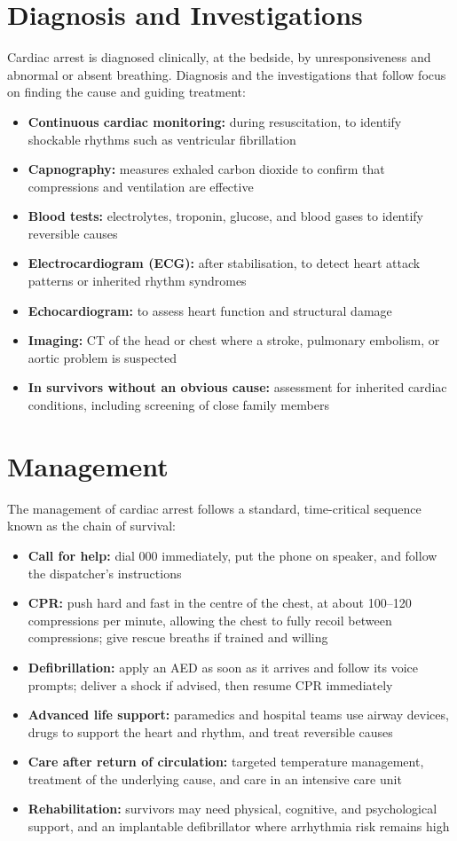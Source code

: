 \section*{Diagnosis and Investigations}
Cardiac arrest is diagnosed clinically, at the bedside, by unresponsiveness and abnormal or absent breathing. Diagnosis and the investigations that follow focus on finding the cause and guiding treatment:
\begin{itemize}
    \item \textbf{Continuous cardiac monitoring:} during resuscitation, to identify shockable rhythms such as ventricular fibrillation
    \item \textbf{Capnography:} measures exhaled carbon dioxide to confirm that compressions and ventilation are effective
    \item \textbf{Blood tests:} electrolytes, troponin, glucose, and blood gases to identify reversible causes
    \item \textbf{Electrocardiogram (ECG):} after stabilisation, to detect heart attack patterns or inherited rhythm syndromes
    \item \textbf{Echocardiogram:} to assess heart function and structural damage
    \item \textbf{Imaging:} CT of the head or chest where a stroke, pulmonary embolism, or aortic problem is suspected
    \item \textbf{In survivors without an obvious cause:} assessment for inherited cardiac conditions, including screening of close family members
\end{itemize}

\section*{Management}
The management of cardiac arrest follows a standard, time-critical sequence known as the chain of survival:
\begin{itemize}
    \item \textbf{Call for help:} dial 000 immediately, put the phone on speaker, and follow the dispatcher's instructions
    \item \textbf{CPR:} push hard and fast in the centre of the chest, at about 100--120 compressions per minute, allowing the chest to fully recoil between compressions; give rescue breaths if trained and willing
    \item \textbf{Defibrillation:} apply an AED as soon as it arrives and follow its voice prompts; deliver a shock if advised, then resume CPR immediately
    \item \textbf{Advanced life support:} paramedics and hospital teams use airway devices, drugs to support the heart and rhythm, and treat reversible causes
    \item \textbf{Care after return of circulation:} targeted temperature management, treatment of the underlying cause, and care in an intensive care unit
    \item \textbf{Rehabilitation:} survivors may need physical, cognitive, and psychological support, and an implantable defibrillator where arrhythmia risk remains high
\end{itemize}

